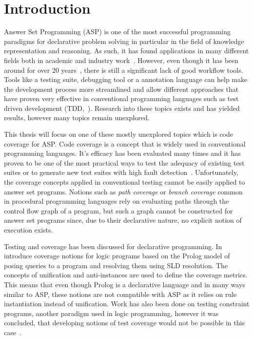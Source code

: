 \chapter{Introduction}
\label{ch:Introduction}
Answer Set Programming (ASP) is one of the most successful programming paradigms for declarative problem solving in particular in the field of knowledge representation and reasoning. As such, it has found applications in many different fields both in academic and industry work~\cite{EGL16}.
However, even though it has been around for over 20 years~\cite{Nie99, MT98}, there is still a significant lack of good workflow tools. Tools like a testing suite, debugging tool or a annotation language can help make the development process more streamlined and allow different approaches that have proven very effective in conventional programming languages such as test driven development (TDD,~\cite{Fra+03}). Research into these topics exists and has yielded results, however many topics remain unexplored.

This thesis will focus on one of these mostly unexplored topics which is code coverage for ASP. Code coverage is a concept that is widely used in conventional programming languages. It's efficacy has been evaluated many times and it has proven to be one of the most practical ways to test the adequacy of existing test suites or to generate new test suites with high fault detection~\cite{GJG14}.
Unfortunately, the coverage concepts applied in conventional testing cannot be easily applied to answer set programs. Notions such as \emph{path coverage} or \emph{branch coverage} common in procedural programming languages rely on evaluating paths through the control flow graph of a program, but such a graph cannot be constructed for answer set programs since, due to their declarative nature, no explicit notion of execution exists.

Testing and coverage has been discussed for declarative programming. In~\cite{BJ98} \citeauthor{BJ98} introduce coverage notions for logic programs based on the Prolog model of posing queries to a program and resolving them using SLD resolution. The concepts of unification and anti-instances are used to define the coverage metrics. This means that even though Prolog is a declarative language and in many ways similar to ASP, these notions are not compatible with ASP as it relies on rule instantiation instead of unification.
Work has also been done on testing constraint programs, another paradigm used in logic programming, however it was concluded, that developing notions of test coverage would not be possible in this case~\cite{LGL10}.

